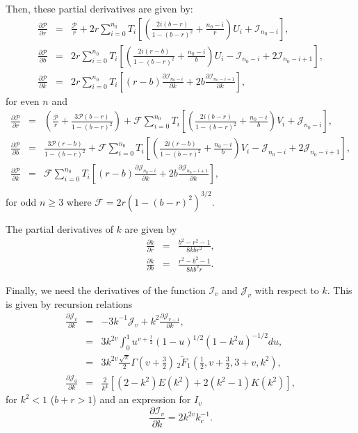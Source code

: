 \documentclass[modern]{aastex61}
\begin{document}
Then, these partial derivatives are given by:
\begin{eqnarray}
\frac{\partial \mathcal{P}}{\partial r}  &=& \frac{\mathcal{P}}{r}+2r\sum_{i=0}^{n_0} T_i  \left[\left(\frac{2i(b-r)}{1-(b-r)^2} + \frac{n_0-i}{r}\right) U_i + \mathcal{I}_{n_0-i}\right],\\
\frac{\partial \mathcal{P}}{\partial b}  &=& 2r\sum_{i=0}^{n_0} T_i  \left[\left(\frac{2i(r-b)}{1-(b-r)^2} + \frac{n_0-i}{b}\right) U_i - \mathcal{I}_{n_0-i} + 2\mathcal{I}_{n_0-i+1}\right],\\
\frac{\partial \mathcal{P}}{\partial k}  &=& 2r\sum_{i=0}^{n_0} T_i  \left[(r-b) \frac{\partial \mathcal{I}_{n_0-i}}{\partial k} + 2b \frac{\partial \mathcal{I}_{n_0-i+1}}{\partial k}\right],
\end{eqnarray}
for even $n$ and
\begin{eqnarray}
\frac{\partial \mathcal{P}}{\partial r}  &=& \left(\frac{\mathcal{P}}{r}+\frac{3\mathcal{P}(b-r)}{1-(b-r)^2}\right)  + \mathcal{F}\sum_{i=0}^{n_0} T_i \left[\left(\frac{2i(b-r)}{1-(b-r)^2} + \frac{n_0-i}{b}\right) V_i + \mathcal{J}_{n_0-i}\right],\\
\frac{\partial \mathcal{P}}{\partial b}  &=& \frac{3\mathcal{P}(r-b)}{1-(b-r)^2}  +\mathcal{F}\sum_{i=0}^{n_0} T_i \left[\left(\frac{2i(r-b)}{1-(b-r)^2} + \frac{n_0-i}{b}\right) V_i - \mathcal{J}_{n_0-i} + 2\mathcal{J}_{n_0-i+1}\right],\\
\frac{\partial \mathcal{P}}{\partial k}  &=& \mathcal{F}\sum_{i=0}^{n_0} T_i \left[(r-b) \frac{\partial\mathcal{J}_{n_0-i}}{\partial k} + 2b \frac{\partial \mathcal{J}_{n_0-i+1}}{\partial k}\right],\\
\end{eqnarray}
for odd $n \ge 3$ where $\mathcal{F} = 2r(1-(b-r)^2)^{3/2}$.

The partial derivatives of $k$ are given by
\begin{eqnarray}
\frac{\partial k}{\partial r} &=& \frac{b^2-r^2-1}{8 k b r^2},\\
\frac{\partial k}{\partial b} &=& \frac{r^2-b^2-1}{8 k b^2 r}.
\end{eqnarray}

Finally, we need the derivatives of the function $\mathcal{I}_v$ and $\mathcal{J}_v$
with respect to $k$.  This is given by recursion relations
\begin{eqnarray}
\frac{\partial \mathcal{J}_v}{\partial k} &=& -3 k^{-1} \mathcal{J}_v +k^2 \frac{\partial \mathcal{J}_{v-1}}{\partial k},\\
&=& 3 k^{2v} \int_0^1 u^{v+\tfrac{1}{2}} (1-u)^{1/2} (1-k^2u)^{-1/2}du,\\ 
&=& 3 k^{2v} \frac{\sqrt{\pi}}{2} \Gamma(v+\tfrac{3}{2}) \,_2{\tilde F}_1(\tfrac{1}{2},v+\tfrac{3}{2},3+v,k^2),\\
\frac{\partial \mathcal{J}_0}{\partial k} &=& \frac{2}{k^4}\left[(2-k^2)E(k^2)+2(k^2-1)K(k^2)\right],
\end{eqnarray}
for $k^2 < 1$ ($b+r > 1$) and an expression for $I_v$
\begin{equation}
\frac{\partial \mathcal{I}_v}{\partial k} = 2k^{2v} k_c^{-1}.
\end{equation}
\end{document}
